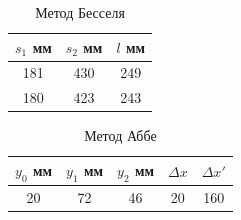 \documentclass[12pt]{article}
\begin{document}
    \begin{table}[b]
        \centering
        \caption{Метод Бесселя}
        \label{tab:2}
        \begin{tabular}{|ccc|}
            \hline
            $s_1$ мм & $s_2$ мм & $l$ мм \\\hline
            181      & 430      & 249    \\
            180      & 423      & 243    \\\hline
        \end{tabular}
    \end{table}

    \begin{table}[b]
        \centering
        \caption{Метод Аббе}
        \label{tab:3}
        \begin{tabular}{|ccccc|}
            \hline
            $y_0$ мм & $y_1$ мм & $y_2$ мм & $\Delta x$ & $\Delta x'$ \\\hline
            20       & 72       & 46       & 20         & 160         \\\hline
        \end{tabular}
    \end{table}
\end{document}
